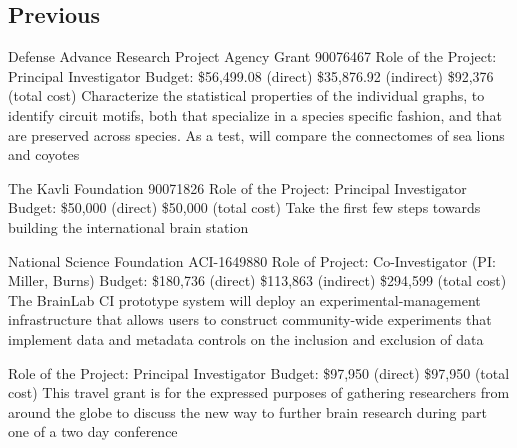 \documentclass[10pt,colorlinks=true,urlcolor=blue]{moderncv}
\begin{document}
\subsection{Previous}
{\newline Defense Advance Research Project Agency Grant 90076467
\newline Role of the Project: Principal Investigator
\newline Budget: \$56,499.08 (direct) \$35,876.92 (indirect) \$92,376 (total cost)
\newline Characterize the statistical properties of the individual graphs, to identify circuit motifs,
both that specialize in a species specific fashion, and that are preserved across species.
As a test, will compare the connectomes of sea lions and coyotes}{}{}{}{}

{\newline The Kavli Foundation 90071826
\newline Role of the Project: Principal Investigator
\newline Budget: \$50,000 (direct) \$50,000 (total cost)
\newline Take the first few steps towards building the international brain station}{}{}{}{}

{\newline National Science Foundation ACI-1649880
\newline Role of Project: Co-Investigator (PI: Miller, Burns)
\newline Budget: \$180,736 (direct) \$113,863 (indirect) \$294,599 (total cost)
\newline The BrainLab CI prototype system will deploy an experimental-management
infrastructure that allows users to construct community-wide experiments that implement
data and metadata controls on the inclusion and exclusion of data}{}{}{}{}

{\newline Role of the Project: Principal Investigator
\newline Budget: \$97,950 (direct) \$97,950 (total cost)
\newline This travel grant is for the expressed purposes of gathering researchers from around the
globe to discuss the new way to further brain research during part one of a two day
conference}{}{}{}{}
\end{document}
